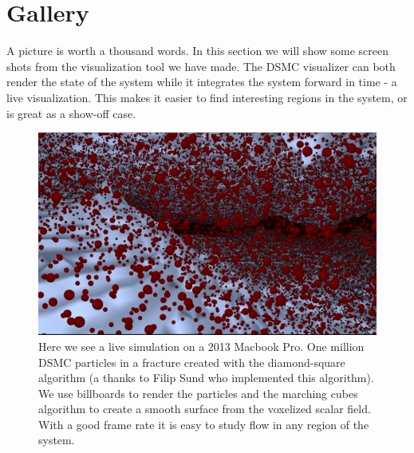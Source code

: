 \section{Gallery}
\label{sec:vis_gallery}
A picture is worth a thousand words. In this section we will show some screen shots from the visualization tool we have made. The DSMC visualizer can both render the state of the system while it integrates the system forward in time - a live visualization. This makes it easier to find interesting regions in the system, or is great as a show-off case.

\begin{figure}[htb]
\begin{center}
\includegraphics[width=\textwidth, trim=0cm 0cm 0cm 0cm, clip]{visualization/figures/marching_cubes_fracture.png}
\end{center}
\caption{Here we see a live simulation on a 2013 Macbook Pro. One million DSMC particles in a fracture created with the diamond-square algorithm (a thanks to Filip Sund who implemented this algorithm). We use billboards to render the particles and the marching cubes algorithm to create a smooth surface from the voxelized scalar field. With a good frame rate it is easy to study flow in any region of the system.}
\label{fig:vis_marching_cubes_2}
\end{figure}

